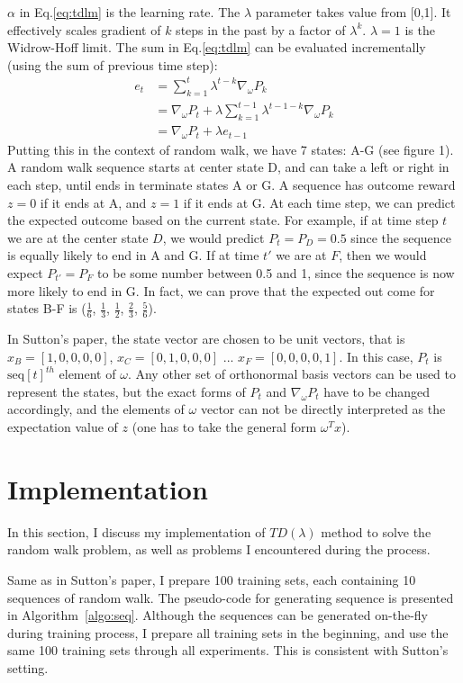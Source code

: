 \documentclass[conference]{IEEEtran}
\begin{document}
	$\alpha$ in Eq.\ref{eq:tdlm} is the learning rate. The $\lambda$ parameter takes value from [0,1]. It effectively scales gradient of $k$ steps in the past by a factor of $\lambda^k$. $\lambda=1$ is the Widrow-Hoff limit. The sum in Eq.\ref{eq:tdlm} can be evaluated incrementally (using the sum of previous time step):
	\begin{align*}
		e_t &= \sum_{k=1}^{t} \lambda^{t-k}\nabla_\omega P_k \\
		& = \nabla_\omega P_t + \lambda \sum_{k=1}^{t-1} \lambda^{t-1-k}\nabla_\omega P_k \\
		& = \nabla_\omega P_t + \lambda e_{t-1}
	\end{align*}
	Putting this in the context of random walk, we have 7 states: A-G (see figure 1). A random walk sequence starts at center state D, and can take a left or right in each step, until ends in terminate states A or G. A sequence has outcome reward $z=0$ if it ends at A, and $z=1$ if it ends at G. At each time step, we can predict the expected outcome based on the current state. For example, if at time step $t$ we are at the center state $D$, we would predict $P_t = P_D = 0.5$ since the sequence is equally likely to end in A and G. If at time $t'$ we are at $F$, then we would expect $P_{t'}=P_F$ to be some number between 0.5 and 1, since the sequence is now more likely to end in G. In fact, we can prove that the expected out come for states B-F is ($\frac{1}{6}$, $\frac{1}{3}$, $\frac{1}{2}$, $\frac{2}{3}$, $\frac{5}{6}$).
	
	In Sutton's paper, the state vector are chosen to be unit vectors, that is $x_B = [1,0,0,0,0]$, $x_C = [0,1,0,0,0]$ ... $x_F = [0,0,0,0,1]$. In this case, $P_t$ is $\mathrm{seq}[t]^{th}$ element of $\omega$. Any other set of orthonormal basis vectors can be used to represent the states, but the exact forms of $P_t$ and $\nabla_\omega P_t$ have to be changed accordingly, and the elements of $\omega$ vector can not be directly interpreted as the expectation value of $z$ (one has to take the general form $\omega^T x$).
	
	
	\section{Implementation}
	In this section, I discuss my implementation of $TD(\lambda)$ method to solve the random walk problem, as well as problems I encountered during the process.
	
	Same as in Sutton's paper, I prepare 100 training sets, each containing 10 sequences of random walk. The pseudo-code for generating sequence is presented in Algorithm~\ref{algo:seq}. Although the sequences can be generated on-the-fly during training process, I prepare all training sets in the beginning, and use the same 100 training sets through all experiments. This is consistent with Sutton's setting.
	
\end{document}
